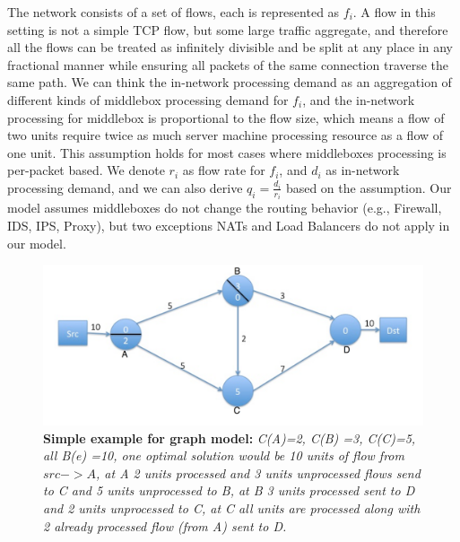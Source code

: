 \documentclass[twocolumn]{article}
\begin{document}
The network consists of a set of flows, each is represented as $f_i$. A flow in this setting is not a simple TCP flow, but some large traffic aggregate, and therefore all the flows can be treated as infinitely divisible and be split at any place in any fractional manner while ensuring all packets of the same connection traverse the same path. We can think the in-network processing demand as an aggregation of different kinds of middlebox processing demand for $f_i$, and the in-network processing for middlebox is proportional to the flow size, which means a flow of two units require twice as much server machine processing resource as a flow of one unit. This assumption holds for most cases where middleboxes processing is per-packet based. We denote $r_i$ as flow rate for $f_i$, and $d_i$ as in-network processing demand, and we can also derive $q_i = \frac{d_i}{r_i}$ based on the assumption. Our model assumes middleboxes do not change the routing behavior (e.g., Firewall, IDS, IPS, Proxy), but two exceptions NATs and Load Balancers do not apply in our model. 
\begin{figure}
\includegraphics[scale=0.18]{demo.png} 
\caption{ \textbf{Simple example for graph model:} \textit{C(A)=2, C(B) =3, C(C)=5, all B(e) =10, one optimal solution would be 10 units of flow from $src->A$, at A 2 units processed and 3 units unprocessed flows send to C and 5 units unprocessed to B, at B 3 units processed sent to D and 2 units unprocessed to C, at C all units are processed along with 2 already processed flow (from A) sent to D.} \label{demo}}
 \end{figure}
\end{document}
